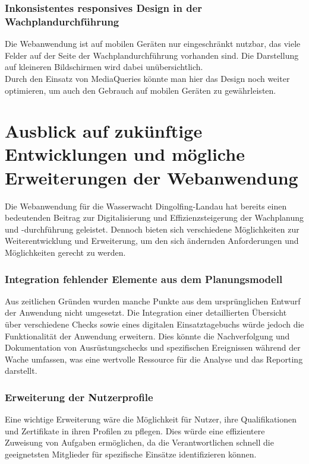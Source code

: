 \documentclass[fontsize=12pt,openright,oneside,paper=a4,BCOR=1cm]{scrbook}
\begin{document}
\subsubsection{Inkonsistentes responsives Design in der Wachplandurchführung}
Die Webanwendung ist auf mobilen Geräten nur eingeschränkt nutzbar, das viele Felder auf der Seite der Wachplandurchführung vorhanden sind. Die Darstellung auf kleineren Bildschirmen wird dabei unübersichtlich. \\
Durch den Einsatz von MediaQueries könnte man hier das Design noch weiter optimieren, um auch den Gebrauch auf mobilen Geräten zu gewährleisten. 

\section{Ausblick auf zukünftige Entwicklungen und mögliche Erweiterungen der Webanwendung}
Die Webanwendung für die Wasserwacht Dingolfing-Landau hat bereits einen bedeutenden Beitrag zur Digitalisierung und Effizienzsteigerung der Wachplanung und -durchführung geleistet. Dennoch bieten sich verschiedene Möglichkeiten zur Weiterentwicklung und Erweiterung, um den sich ändernden Anforderungen und Möglichkeiten gerecht zu werden.

\subsubsection{Integration fehlender Elemente aus dem Planungsmodell}
Aus zeitlichen Gründen wurden manche Punkte aus dem ursprünglichen Entwurf der Anwendung nicht umgesetzt. Die Integration einer detaillierten Übersicht über verschiedene Checks sowie eines digitalen Einsatztagebuchs würde jedoch die Funktionalität der Anwendung erweitern. Dies könnte die Nachverfolgung und Dokumentation von Ausrüstungschecks und spezifischen Ereignissen während der Wache umfassen, was eine wertvolle Ressource für die Analyse und das Reporting darstellt.

\subsubsection{Erweiterung der Nutzerprofile}
Eine wichtige Erweiterung wäre die Möglichkeit für Nutzer, ihre Qualifikationen und Zertifikate in ihren Profilen zu pflegen. Dies würde eine effizientere Zuweisung von Aufgaben ermöglichen, da die Verantwortlichen schnell die geeignetsten Mitglieder für spezifische Einsätze identifizieren können.
\end{document}
